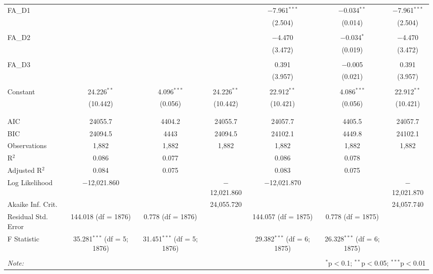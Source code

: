 \begin{table}[!htbp]
{\begin{tabular}{@{\extracolsep{5pt}}lcccccc}
 FA\_D1 &  &  &  & $-$7.961$^{***}$ & $-$0.034$^{**}$ & $-$7.961$^{***}$ \\ 
  &  &  &  & (2.504) & (0.014) & (2.504) \\ 
  & & & & & & \\ 
 FA\_D2 &  &  &  & $-$4.470 & $-$0.034$^{*}$ & $-$4.470 \\ 
  &  &  &  & (3.472) & (0.019) & (3.472) \\ 
  & & & & & & \\ 
 FA\_D3 &  &  &  & 0.391 & $-$0.005 & 0.391 \\ 
  &  &  &  & (3.957) & (0.021) & (3.957) \\ 
  & & & & & & \\ 
 Constant & 24.226$^{**}$ & 4.096$^{***}$ & 24.226$^{**}$ & 22.912$^{**}$ & 4.086$^{***}$ & 22.912$^{**}$ \\ 
  & (10.442) & (0.056) & (10.442) & (10.421) & (0.056) & (10.421) \\ 
  & & & & & & \\ 
\hline \\[-1.8ex] 
AIC & 24055.7 & 4404.2 & 24055.7 & 24057.7 & 4405.5 & 24057.7 \\ 
BIC & 24094.5 & 4443 & 24094.5 & 24102.1 & 4449.8 & 24102.1 \\ 
Observations & 1,882 & 1,882 & 1,882 & 1,882 & 1,882 & 1,882 \\ 
R$^{2}$ & 0.086 & 0.077 &  & 0.086 & 0.078 &  \\ 
Adjusted R$^{2}$ & 0.084 & 0.075 &  & 0.083 & 0.075 &  \\ 
Log Likelihood & $-$12,021.860 &  & $-$12,021.860 & $-$12,021.870 &  & $-$12,021.870 \\ 
Akaike Inf. Crit. &  &  & 24,055.720 &  &  & 24,057.740 \\ 
Residual Std. Error & 144.018 (df = 1876) & 0.778 (df = 1876) &  & 144.057 (df = 1875) & 0.778 (df = 1875) &  \\ 
F Statistic & 35.281$^{***}$ (df = 5; 1876) & 31.451$^{***}$ (df = 5; 1876) &  & 29.382$^{***}$ (df = 6; 1875) & 26.328$^{***}$ (df = 6; 1875) &  \\ 
\hline 
\hline \\[-1.8ex] 
\textit{Note:}  & \multicolumn{6}{r}{$^{*}$p$<$0.1; $^{**}$p$<$0.05; $^{***}$p$<$0.01} \\ 
\end{tabular}}
\end{table} 
